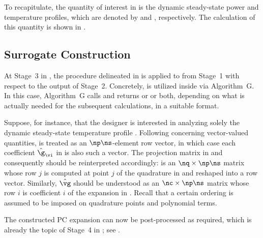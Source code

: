 To recapitulate, the quantity of interest \g in  is the
dynamic steady-state power and temperature profiles, which are denoted by \mp
and \mq, respectively. The calculation of this quantity is shown in
.

\subsection{Surrogate Construction}

At Stage~3 in , the procedure delineated in
 is applied to
 from Stage~1 with respect to the
output of Stage~2. Concretely,  is
utilized inside  via Algorithm~G. In this case,
Algorithm~G calls  and returns \mp
or \mq or both, depending on what is actually needed for the subsequent
calculations, in a suitable format.

Suppose, for instance, that the designer is interested in analyzing solely the
dynamic steady-state temperature profile \mq. Following
 concerning vector-valued quantities, \g is
treated as an $\np \ns$-element row vector, in which case each coefficient
$\hat{\g}_{\vi}$ in  is also such a vector. The projection
matrix in  and consequently
 should be reinterpreted accordingly: \vg is an $\nq
\times \np \ns$ matrix whose row $j$ is \mq computed at point $j$ of the
quadrature in  and reshaped into a row vector.
Similarly, $\hat{\vg}$ should be understood as an $\nc \times \np \ns$ matrix
whose row $i$ is coefficient $i$ of the expansion in .
Recall that a certain ordering is assumed to be imposed on quadrature points and
polynomial terms.

The constructed \ac{PC} expansion can now be post-processed as required, which
is already the topic of Stage~4 in ; see
.
